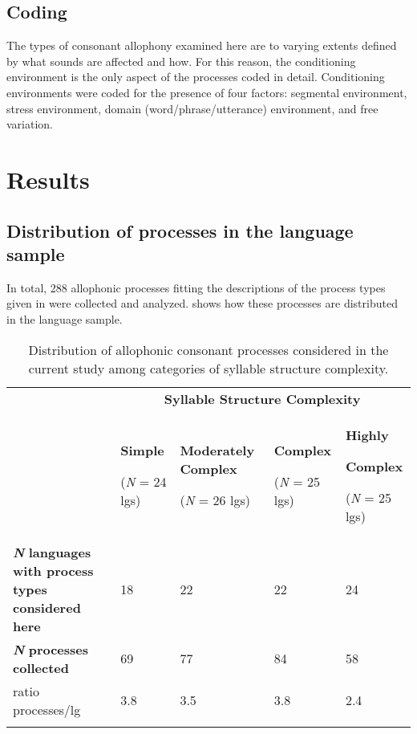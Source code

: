\subsection{Coding}\label{sec:7.2.2}

  The types of consonant allophony examined here are to varying extents defined by what sounds are affected and how. For this reason, the conditioning environment is the only aspect of the processes coded in detail. Conditioning environments were coded for the presence of four factors: segmental environment, stress environment, domain (word/phrase/utterance) environment, and free variation.

\section{Results}\label{sec:7.3}
\subsection{Distribution of processes in the language sample}\label{sec:7.3.1}

  In total, 288 allophonic processes fitting the descriptions of the process types given in  were collected and analyzed.  shows how these processes are distributed in the language sample. 

\begin{table}
\begin{tabularx}{\textwidth}{XXXXX}
\lsptoprule
 & \multicolumn{4}{c}{ \textbf{Syllable Structure Complexity}}\\
& { \textbf{Simple}}

 (\textit{N} = 24 lgs) & { \textbf{Moderately Complex}}

 (\textit{N} = 26 lgs) & { \textbf{Complex}}

 (\textit{N} = 25 lgs) & { \textbf{Highly} }

{ \textbf{Complex}}

 (\textit{N} = 25 lgs)\\
 \textbf{\textit{N} }\textbf{languages with process types considered here} & 18 & 22 & 22 & 24\\
 \textbf{\textit{N}} \textbf{processes collected} & 69 & 77 & 84 & 58\\
 ratio processes/lg & 3.8 & 3.5 & 3.8 & 2.4\\
\lspbottomrule
\end{tabularx}
\caption{\label{tab:7.1}Distribution of allophonic consonant processes considered in the current study among categories of syllable structure complexity.}
\end{table}

